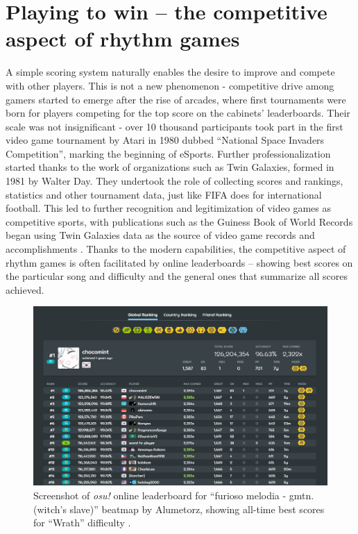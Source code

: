 \section{Playing to win -- the competitive aspect of rhythm games}
A simple scoring system naturally enables the desire to improve and compete with other players. This is not a new phenomenon - competitive drive among gamers started to emerge after the rise of arcades, where first tournaments were born for players competing for the top score on the cabinets' leaderboards. Their scale was not insignificant - over 10 thousand participants took part in the first video game tournament by Atari in 1980 dubbed ``National Space Invaders Competition'', marking the beginning of eSports. Further professionalization started thanks to the work of organizations such as Twin Galaxies, formed in 1981 by Walter Day. They undertook the role of collecting scores and rankings, statistics and other tournament data, just like FIFA does for international football. This led to further recognition and legitimization of video games as competitive sports, with publications such as the Guiness Book of World Records began using Twin Galaxies data as the source of video game records and accomplishments \cite{pioneeringesport}.  Thanks to the modern capabilities, the competitive aspect of rhythm games is often facilitated by online leaderboards -- showing best scores on the particular song and difficulty and the general ones that summarize all scores achieved.

\begin{figure}[h]
    \centering\includegraphics[scale=0.42]{obrazki/songleaderboard.png}
    \caption{Screenshot of \textit{osu!} online leaderboard for ``furioso melodia - gmtn. (witch's slave)'' beatmap by Alumetorz, showing all-time best scores for ``Wrath'' difficulty \cite{osuleaderboards2}.}
    \label{fig:osuleaderboard2}
\end{figure}


